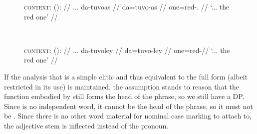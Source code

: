 \begin{figure}
\ex{}\label{ex:danoungender}
\begin{minipage}[t]{.5\remaining}
\tl\quad\begingl
	\glpreamble \textsc{context:}  (\An{}): //
	\gla ... da-tuvoas //
	\glb {} da=tuvo-as //
	\glc {} one=red-\Parg{}.\An{} //
	\glft `... the red one' // 
\endgl
\end{minipage}
~
\begin{minipage}[t]{.5\remaining}
\tl\quad\begingl
	\glpreamble \textsc{context:}  (\Inan{}): //
	\gla ... da-tuvoley //
	\glb {} da=tuvo-ley //
	\glc {} one=red-\PargI //
	\glft `... the red one' // 
\endgl
\end{minipage}
\xe
\end{figure}

If the analysis that  is a simple clitic and thus equivalent to
the full form  (albeit restricted in its use) is maintained,
the assumption stands to reason that the function embodied by 
still forms the head of the phrase, so we still have a DP. Since 
is no independent word, it cannot be the head of the phrase, so it must not be
. Since there is no other word material for nominal case marking to
attach to, the adjective stem is inflected instead of the pronoun.




